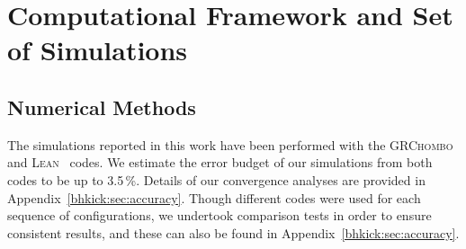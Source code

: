 \section{Computational Framework and Set of Simulations}
\label{bhkick:sec:NR}
% 
\subsection{Numerical Methods}

The simulations reported in this work have been performed with the
\textsc{GRChombo}~\cite{Clough:2015sqa, GRChomboWebsite} and 
\textsc{Lean}~\cite{Sperhake:2006cy} codes.
We estimate the error budget of our simulations from both codes to be up to 3.5\,\%. Details of our convergence analyses are provided in 
Appendix~\ref{bhkick:sec:accuracy}. Though different codes were
used for each sequence of configurations, we undertook comparison tests 
in order to ensure consistent results, and these can also be found in
Appendix~\ref{bhkick:sec:accuracy}.

